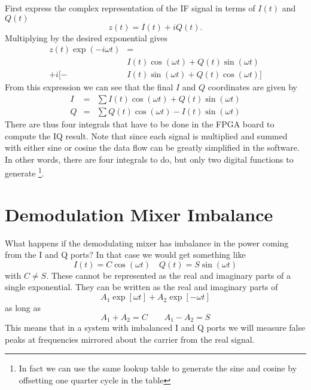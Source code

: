 First express the complex representation of the IF signal in terms of $I(t)$ and $Q(t)$ \begin{equation}
z(t) = I(t) + iQ(t). \end{equation}
Multiplying by the desired exponential gives \begin{align}
z(t) \exp \left(-i \omega t \right) &= \nonumber \\
        & I(t) \cos (\omega t) + Q(t) \sin (\omega t) \nonumber \\
+ i [ - & I(t) \sin (\omega t) + Q(t) \cos (\omega t) ] \end{align}
From this expression we can see that the final $I$ and $Q$ coordinates are given by \begin{eqnarray}
I &=& \sum I(t)\cos(\omega t) + Q(t) \sin(\omega t) \\
Q &=& \sum Q(t)\cos(\omega t) - I(t) \sin(\omega t) \end{eqnarray}
There are thus four integrals that have to be done in the FPGA board to compute the IQ result. Note that since each signal is multiplied and summed with either sine or cosine the data flow can be greatly simplified in the software. In other words, there are four integrals to do, but only two digital functions to generate \footnote{In fact we can use the same lookup table to generate the sine and cosine by offsetting one quarter cycle in the table}.

\section{Demodulation Mixer Imbalance}

What happens if the demodulating mixer has imbalance in the power coming from the I and Q ports? In that case we would get something like \begin{equation}
I(t) = C \cos (\omega t) \quad Q(t) = S \sin (\omega t) \end{equation}
with $C \neq S$. These cannot be represented as the real and imaginary parts of a single exponential. They can be written as the real and imaginary parts of \begin{equation}
A_1 \exp \left[ \omega t \right] + A_2 \exp \left[ -\omega t \right] \end{equation}
as long as \begin{equation}
A_1 + A_2 = C \qquad A_1 - A_2 = S \end{equation}
This means that in a system with imbalanced I and Q ports we will measure false peaks at frequencies mirrored about the carrier from the real signal.
